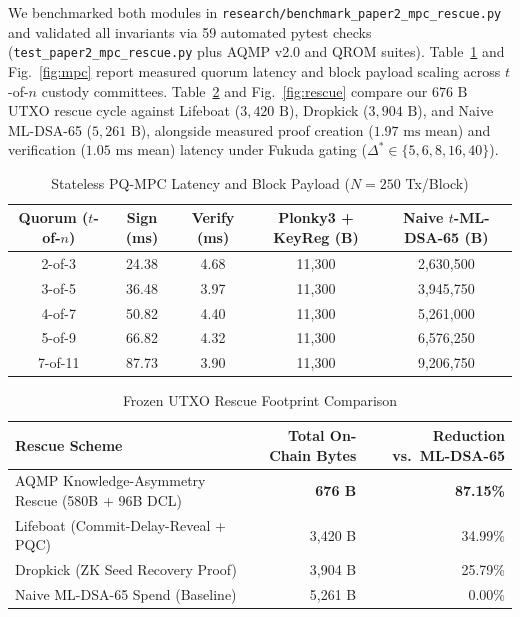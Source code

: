 \documentclass[conference,compsoc]{IEEEtran}
\begin{document}
We benchmarked both modules in \texttt{research/\allowbreak benchmark\_\allowbreak paper2\_\allowbreak mpc\_\allowbreak rescue.py} and validated all invariants via 59 automated pytest checks (\texttt{test\_paper2\_\allowbreak mpc\_\allowbreak rescue.py} plus AQMP v2.0 and QROM suites). Table~\ref{tab:mpc} and Fig.~\ref{fig:mpc} report measured quorum latency and block payload scaling across $t$-of-$n$ custody committees. Table~\ref{tab:rescue} and Fig.~\ref{fig:rescue} compare our $676\text{ B}$ UTXO rescue cycle against Lifeboat ($3{,}420\text{ B}$), Dropkick ($3{,}904\text{ B}$), and Naive ML-DSA-65 ($5{,}261\text{ B}$), alongside measured proof creation ($1.97\text{ ms}$ mean) and verification ($1.05\text{ ms}$ mean) latency under Fukuda gating ($\Delta^* \in \{5, 6, 8, 16, 40\}$).

\begin{table}[t]
\centering
\footnotesize
\caption{Stateless PQ-MPC Latency and Block Payload ($N = 250$ Tx/Block)}
\label{tab:mpc}
\begin{tabular}{@{}ccccc@{}}
\toprule
Quorum ($t$-of-$n$) & Sign (ms) & Verify (ms) & Plonky3 + KeyReg (B) & Naive $t$-ML-DSA-65 (B) \\
\midrule
2-of-3 & 24.38 & 4.68 & 11,300 & 2,630,500 \\
3-of-5 & 36.48 & 3.97 & 11,300 & 3,945,750 \\
4-of-7 & 50.82 & 4.40 & 11,300 & 5,261,000 \\
5-of-9 & 66.82 & 4.32 & 11,300 & 6,576,250 \\
7-of-11 & 87.73 & 3.90 & 11,300 & 9,206,750 \\
\bottomrule
\end{tabular}
\end{table}

\begin{table}[t]
\centering
\footnotesize
\caption{Frozen UTXO Rescue Footprint Comparison}
\label{tab:rescue}
\begin{tabular}{@{}lrr@{}}
\toprule
Rescue Scheme & Total On-Chain Bytes & Reduction vs.\ ML-DSA-65 \\
\midrule
AQMP Knowledge-Asymmetry Rescue (580B + 96B DCL) & \textbf{676 B} & \textbf{87.15\%} \\
Lifeboat (Commit-Delay-Reveal + PQC) & 3,420 B & 34.99\% \\
Dropkick (ZK Seed Recovery Proof) & 3,904 B & 25.79\% \\
Naive ML-DSA-65 Spend (Baseline) & 5,261 B & 0.00\% \\
\bottomrule
\end{tabular}
\end{table}
\end{document}
